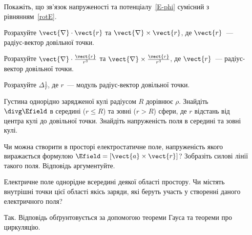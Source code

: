 \begin{problem}
    Покажіть, що зв'язок напруженості та потенціалу~\ref{E-phi} сумісний з рівнянням~\ref{rotE}.
\end{problem}


\begin{problem}
    Розрахуйте $\vect{\nabla}\cdot\vect{r}$ та  $\vect{\nabla}\times\vect{r}$, де $\vect{r}$~--- радіус-вектор довільної точки.
\end{problem}

\begin{problem}
    Розрахуйте $\vect{\nabla}\cdot\frac{\vect{r}}{r^3}$ та $\vect{\nabla}\times\frac{\vect{r}}{r^3}$, де $\vect{r}$~--- радіус-вектор довільної точки.
\end{problem}

\begin{problem}
    Розрахуйте $\Delta\frac1r$, де $r$~--- модуль радіус-вектор довільної точки.
\end{problem}

\begin{problem}
    Густина однорідно зарядженої кулі радіусом $R$ дорівнює $\rho$. Знайдіть $\divg\Efield$ в середині ($r \le R$) та зовні ($r > R$) сфери, де $r$ відстань від центра кулі до довільної точки. Знайдіть напруженість поля в середині та зовні кулі.
\end{problem}

\begin{problem}
    Чи можна створити в просторі електростатичне поле, напруженість якого виражається формулою $\Efield = \left[ \vect{a}\times\vect{r}\right] $? Зобразіть силові лінії такого поля. Відповідь аргументуйте.
\end{problem}

\begin{problem}
    Електричне поле однорідне всередині деякої області простору. Чи містять
	внутрішні точки цієї області якісь заряди, які беруть участь у створенні даного електричного поля?
\begin{solution}
	Так. Відповідь обґрунтовується за допомогою теореми Гауса та теореми про циркуляцію.
\end{solution}
\end{problem}


